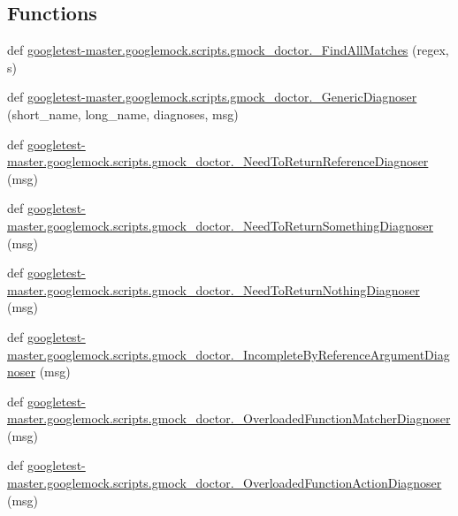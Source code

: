 \subsection*{Functions}
\begin{DoxyCompactItemize}
\item 
def \mbox{\hyperlink{namespacegoogletest-master_1_1googlemock_1_1scripts_1_1gmock__doctor_a4be0f8dac41eaca5bdd44baf5746ca8c}{googletest-\/master.\+googlemock.\+scripts.\+gmock\+\_\+doctor.\+\_\+\+Find\+All\+Matches}} (regex, s)
\item 
def \mbox{\hyperlink{namespacegoogletest-master_1_1googlemock_1_1scripts_1_1gmock__doctor_ade650444c2a865ed9d05b5981f316b24}{googletest-\/master.\+googlemock.\+scripts.\+gmock\+\_\+doctor.\+\_\+\+Generic\+Diagnoser}} (short\+\_\+name, long\+\_\+name, diagnoses, msg)
\item 
def \mbox{\hyperlink{namespacegoogletest-master_1_1googlemock_1_1scripts_1_1gmock__doctor_a03dd29c054744af8138527968286bdf9}{googletest-\/master.\+googlemock.\+scripts.\+gmock\+\_\+doctor.\+\_\+\+Need\+To\+Return\+Reference\+Diagnoser}} (msg)
\item 
def \mbox{\hyperlink{namespacegoogletest-master_1_1googlemock_1_1scripts_1_1gmock__doctor_a3bd7360b2d5d33ec00dcb9547df0f35c}{googletest-\/master.\+googlemock.\+scripts.\+gmock\+\_\+doctor.\+\_\+\+Need\+To\+Return\+Something\+Diagnoser}} (msg)
\item 
def \mbox{\hyperlink{namespacegoogletest-master_1_1googlemock_1_1scripts_1_1gmock__doctor_a75a358e934a8a78cec8c214240c0dd17}{googletest-\/master.\+googlemock.\+scripts.\+gmock\+\_\+doctor.\+\_\+\+Need\+To\+Return\+Nothing\+Diagnoser}} (msg)
\item 
def \mbox{\hyperlink{namespacegoogletest-master_1_1googlemock_1_1scripts_1_1gmock__doctor_a2c4c9e38261c39f3110b9d1510c24dde}{googletest-\/master.\+googlemock.\+scripts.\+gmock\+\_\+doctor.\+\_\+\+Incomplete\+By\+Reference\+Argument\+Diagnoser}} (msg)
\item 
def \mbox{\hyperlink{namespacegoogletest-master_1_1googlemock_1_1scripts_1_1gmock__doctor_a68cad62e5d928a460f2a2e6a2e25710e}{googletest-\/master.\+googlemock.\+scripts.\+gmock\+\_\+doctor.\+\_\+\+Overloaded\+Function\+Matcher\+Diagnoser}} (msg)
\item 
def \mbox{\hyperlink{namespacegoogletest-master_1_1googlemock_1_1scripts_1_1gmock__doctor_a42f7107bb50907e4109a43f114c4678d}{googletest-\/master.\+googlemock.\+scripts.\+gmock\+\_\+doctor.\+\_\+\+Overloaded\+Function\+Action\+Diagnoser}} (msg)
\item 

\end{DoxyCompactItemize}
